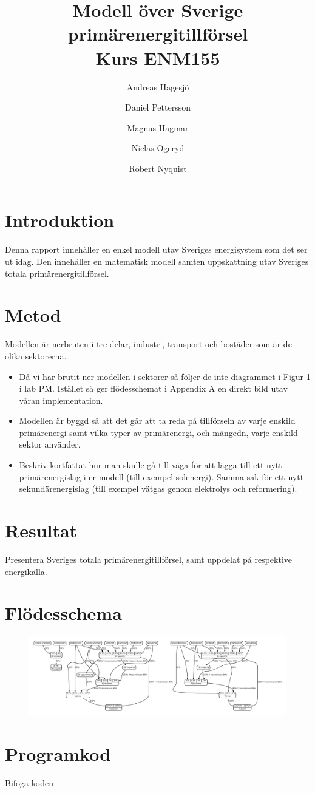 \documentclass[a4paper,11pt,fleqn]{article}
\author{Andreas Hagesjö \and Daniel Pettersson \and
Magnus Hagmar \and Niclas Ogeryd \and Robert Nyquist}
\title{Modell över Sverige primärenergitillförsel \\ Kurs ENM155}
\begin{document}
\maketitle

\section{Introduktion}
Denna rapport innehåller en enkel modell utav Sveriges energisystem som det ser ut idag.
Den innehåller en matematisk modell samten uppskattning utav Sveriges totala primärenergitillförsel.


\section{Metod}
Modellen är nerbruten i tre delar, industri, transport och bostäder som är de olika sektorerna.


\begin{itemize}
\item Då vi har brutit ner modellen i sektorer så följer de inte diagrammet i Figur 1 i lab PM.
Istället så ger flödesschemat i Appendix A en direkt bild utav våran implementation.


\item Modellen är byggd så att det går att ta reda på tillförseln av varje enskild primärenergi samt vilka typer av primärenergi, och mängedn, varje enskild sektor använder.

\item

Beskriv kortfattat hur man skulle gå till väga för att lägga till ett
nytt primärenergislag i er modell (till exempel solenergi). Samma sak för
ett nytt sekundärenergislag (till exempel vätgas genom elektrolys och
reformering).
\end{itemize}

\section{Resultat}
Presentera Sveriges totala primärenergitillförsel, samt uppdelat på
respektive energikälla.

\appendix
\section{Flödesschema}
\begin{figure}[h]
	\centering 
 		\includegraphics[scale = 0.2]{diagram.pdf}
		\label{diagram}
\end{figure}
\section{Programkod}
Bifoga koden
\end{document}
